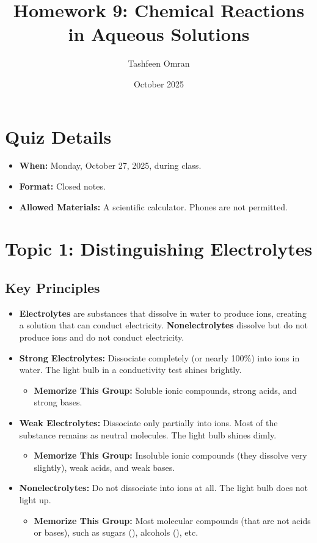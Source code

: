 \documentclass{article}
\title{Homework 9: Chemical Reactions in Aqueous Solutions}
\author{Tashfeen Omran}
\date{October 2025}
\begin{document}
\maketitle

\section*{Quiz Details}
\begin{itemize}
    \item \textbf{When:} Monday, October 27, 2025, during class.
    \item \textbf{Format:} Closed notes.
    \item \textbf{Allowed Materials:} A scientific calculator. Phones are not permitted.
\end{itemize}

\section{Topic 1: Distinguishing Electrolytes}
\subsection{Key Principles}
\begin{itemize}
    \item \textbf{Electrolytes} are substances that dissolve in water to produce ions, creating a solution that can conduct electricity. \textbf{Nonelectrolytes} dissolve but do not produce ions and do not conduct electricity.
    \item \textbf{Strong Electrolytes:} Dissociate completely (or nearly 100\%) into ions in water. The light bulb in a conductivity test shines brightly.
        \begin{itemize}
            \item \textbf{Memorize This Group:} Soluble ionic compounds, strong acids, and strong bases.
        \end{itemize}
    \item \textbf{Weak Electrolytes:} Dissociate only partially into ions. Most of the substance remains as neutral molecules. The light bulb shines dimly.
        \begin{itemize}
            \item \textbf{Memorize This Group:} Insoluble ionic compounds (they dissolve very slightly), weak acids, and weak bases.
        \end{itemize}
    \item \textbf{Nonelectrolytes:} Do not dissociate into ions at all. The light bulb does not light up.
        \begin{itemize}
            \item \textbf{Memorize This Group:} Most molecular compounds (that are not acids or bases), such as sugars (), alcohols (), etc.
        \end{itemize}
\end{itemize}
\end{document}
